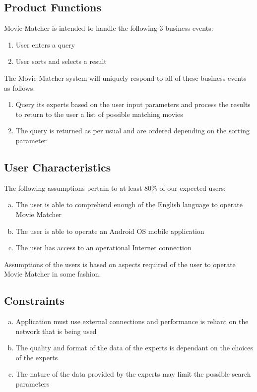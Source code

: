 \documentclass[]{article}
\begin{document}
\subsection{Product Functions}
\label{sub:product_functions}
Movie Matcher is intended to handle the following 3 business events:
\begin{enumerate}
	\item User enters a query
	\item User sorts and selects a result
\end{enumerate}
The Movie Matcher system will uniquely respond to all of these business events as follows:
\begin{enumerate}
\item Query its experts based on the user input parameters and process the results to return to the user a list of possible matching movies
\item The query is returned as per usual and are ordered depending on the sorting parameter
\end{enumerate}

\subsection{User Characteristics}
\label{sub:user_characteristics}
The following assumptions pertain to at least 80\% of our expected users:
\begin{enumerate}[a)]
	\item The user is able to comprehend enough of the English language to operate Movie Matcher
	\item The user is able to operate an Android OS mobile application
	\item The user has access to an operational Internet connection
\end{enumerate}
Assumptions of the users is based on aspects required of the user to operate Movie Matcher in some fashion.

\subsection{Constraints}
\label{sub:constraints}
\begin{enumerate}[a)]
	\item Application must use external connections and performance is reliant on the network that is being used
	\item The quality and format of the data of the experts is dependant on the choices of the experts
	\item The nature of the data provided by the experts may limit the possible search parameters
\end{enumerate}
\end{document}
